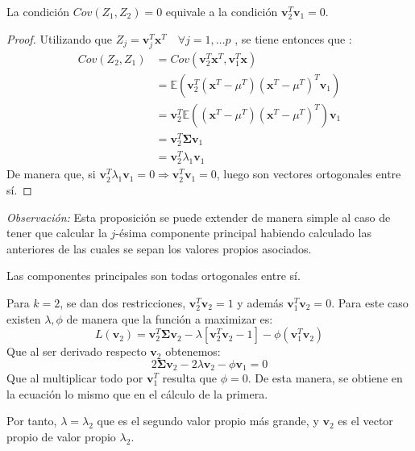 \begin{propo}
La condición $Cov(Z_1,Z_2)=0 $ equivale a la condición $\textbf{v}_2^T\textbf{v}_1 = 0$.
\begin{proof}
Utilizando que $Z_j=\textbf{v}_j^T \textbf{x}^T \quad \forall j=1,\ldots p$ , se tiene entonces que :
\begin{align*}
Cov(Z_2,Z_1)&= Cov (\textbf{v}_2^T\mathbf{x}^T,\mathbf{v}_1^T\mathbf{x})\\ 
&= \mathbb{E}(\mathbf{v}_2^T(\mathbf{x}^T-\mu^T)(\mathbf{x}^T-\mu^T)^T \mathbf{v}_1)\\
&= \textbf{v}_2^T \mathbb{E}((\textbf{x}^T-\mu^T)(\mathbf{x}^T-\mu^T)^T) \textbf{v}_1\\
&= \textbf{v}_2^T \mathbf{\Sigma} \textbf{v}_1 \\
&= \textbf{v}_2^T \lambda_1 \textbf{v}_1
\end{align*}
\noindent De manera que, si $\mathbf{v}_2^T \lambda_1 \mathbf{v}_1 = 0 \Rightarrow \mathbf{v}_2^T \mathbf{v}_1=0 $, luego son vectores ortogonales entre sí.
\end{proof}
\end{propo}


\noindent \emph{Observación: } Esta proposición se puede extender de manera simple al caso de tener que calcular la $j$-ésima componente principal habiendo calculado las anteriores de las cuales se sepan los valores propios asociados. 

\begin{coro}
Las componentes principales son todas ortogonales entre sí. 
\end{coro}

\noindent Para $k=2$, se dan dos restricciones, $\textbf{v}_2^T\textbf{v}_2=1$ y además $\textbf{v}_1^T \textbf{v}_2=0$. Para este caso existen $\lambda, \phi$ de manera que la función a maximizar es:
\begin{equation}
 L(\textbf{v}_2)=\textbf{v}_2^T \mathbf{\Sigma} \textbf{v}_2 - \lambda[\textbf{v}_2^T \textbf{v}_2-1]-\phi(\textbf{v}_1^T \textbf{v}_2)
\end{equation}
Que al ser derivado respecto $\textbf{v}_2$ obtenemos:
\begin{equation}
2\mathbf{\Sigma} \textbf{v}_2 - 2\lambda\textbf{v}_2-\phi \textbf{v}_1=0
\end{equation}
Que al multiplicar todo por $\mathbf{v}_1^T$ resulta que $\phi=0$. De esta manera, se obtiene en la ecuación lo mismo que en el cálculo de la primera. 

\noindent Por tanto, $\lambda=\lambda_2$ que es el segundo valor propio más grande, y $\mathbf{v}_2$ es el vector propio de valor propio $\lambda_2$.

